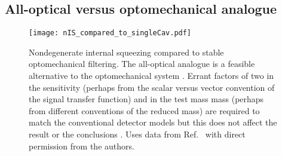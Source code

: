 \subsection{All-optical versus optomechanical analogue}

\begin{figure}
	\centering
	\texttt{[image: nIS\_compared\_to\_singleCav.pdf]}
	\caption{  Nondegenerate internal squeezing compared to stable optomechanical filtering. The all-optical analogue is a feasible alternative to the optomechanical system . Errant  factors of two in the sensitivity (perhaps from the scalar versus vector convention of the signal transfer function) and in the test mass mass (perhaps from different conventions of the reduced mass) are required to match the conventional detector models but this does not affect the result or the conclusions . Uses data from Ref.~\cite{} with direct permission from the authors.}
	\label{fig:nIS_vs_sWLC}
\end{figure}

